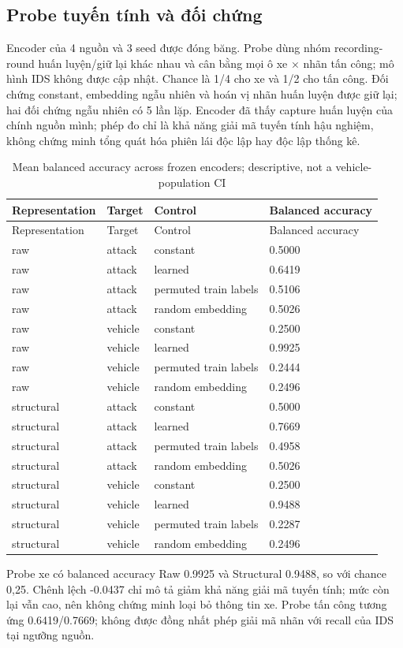 \documentclass[12pt,a4paper,oneside,openany]{extbook}
\begin{document}
\subsection{Probe tuyến tính và đối chứng}
Encoder của 4 nguồn và 3 seed được đóng băng. Probe dùng nhóm recording-round huấn luyện/giữ lại khác nhau và cân bằng mọi ô xe × nhãn tấn công; mô hình IDS không được cập nhật. Chance là 1/4 cho xe và 1/2 cho tấn công. Đối chứng constant, embedding ngẫu nhiên và hoán vị nhãn huấn luyện được giữ lại; hai đối chứng ngẫu nhiên có 5 lần lặp. Encoder đã thấy capture huấn luyện của chính nguồn mình; phép đo chỉ là khả năng giải mã tuyến tính hậu nghiệm, không chứng minh tổng quát hóa phiên lái độc lập hay độc lập thống kê.
\begin{longtable}{P{3.3cm}P{1.6cm}P{4.7cm}P{3.1cm}}
\caption{Mean balanced accuracy across frozen encoders; descriptive, not a vehicle-population CI}\label{tab:extension-probes}\\\toprule
Representation & Target & Control & Balanced accuracy\\\midrule\endfirsthead
\toprule
Representation & Target & Control & Balanced accuracy\\\midrule\endhead
raw & attack & constant & 0.5000\\
raw & attack & learned & 0.6419\\
raw & attack & permuted train labels & 0.5106\\
raw & attack & random embedding & 0.5026\\
raw & vehicle & constant & 0.2500\\
raw & vehicle & learned & 0.9925\\
raw & vehicle & permuted train labels & 0.2444\\
raw & vehicle & random embedding & 0.2496\\
structural & attack & constant & 0.5000\\
structural & attack & learned & 0.7669\\
structural & attack & permuted train labels & 0.4958\\
structural & attack & random embedding & 0.5026\\
structural & vehicle & constant & 0.2500\\
structural & vehicle & learned & 0.9488\\
structural & vehicle & permuted train labels & 0.2287\\
structural & vehicle & random embedding & 0.2496\\
\bottomrule\end{longtable}
Probe xe có balanced accuracy Raw 0.9925 và Structural 0.9488, so với chance 0,25. Chênh lệch -0.0437 chỉ mô tả giảm khả năng giải mã tuyến tính; mức còn lại vẫn cao, nên không chứng minh loại bỏ thông tin xe. Probe tấn công tương ứng 0.6419/0.7669; không được đồng nhất phép giải mã nhãn với recall của IDS tại ngưỡng nguồn.
\end{document}
